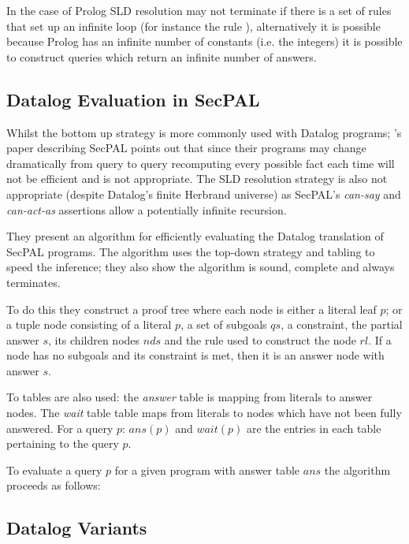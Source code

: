 \documentclass[a4paper,sfsidenotes]{tufte-book}
\begin{document}
In the case of Prolog \ac{SLD} resolution may
not terminate if there is a set of rules that set up an infinite loop (for
instance the rule ),
alternatively it is possible because Prolog has an infinite number of constants
(i.e. the integers) it is possible to construct queries which return an infinite
number of answers.

\subsection{Datalog Evaluation in SecPAL}

Whilst the bottom up strategy is more commonly used with Datalog programs;
\citeauthor*{Becker:2009vt}'s paper describing SecPAL\cite{Becker:2010vh} points out that since
their programs may change dramatically from query to query recomputing every
possible fact each time  will not be efficient and is not appropriate.  The
\ac{SLD} resolution strategy is also not appropriate (despite Datalog's finite
Herbrand universe) as SecPAL's \emph{can-say} and \emph{can-act-as} assertions
allow a potentially infinite recursion.

They present an algorithm for efficiently evaluating the Datalog translation of
SecPAL programs.  The algorithm uses the top-down strategy and tabling to speed
the inference; they also show the algorithm is sound, complete and always
terminates. 

To do this they construct a proof tree where each node is either a literal leaf
$p$; or a tuple node consisting of a literal $p$, a set of subgoals $qs$, a
constraint, the partial answer $s$, its children nodes $nds$ and the rule used
to construct the node $rl$.  If a node has no subgoals and its constraint
is met, then it is an answer node with answer $s$.

To tables are also used: the \emph{answer} table is mapping from literals to
answer nodes.  The \emph{wait} table table maps from literals to nodes which
have not been fully answered.  For a query $p$: $ans(p)$ and $wait(p)$ are the
entries in each table pertaining to the query $p$.

To evaluate a query $p$ for a given program with answer table $ans$ the
algorithm proceeds as follows:

\begin{algorithm}
  \Fn
\end{algorithm}


\subsection{Datalog Variants}
\end{document}

